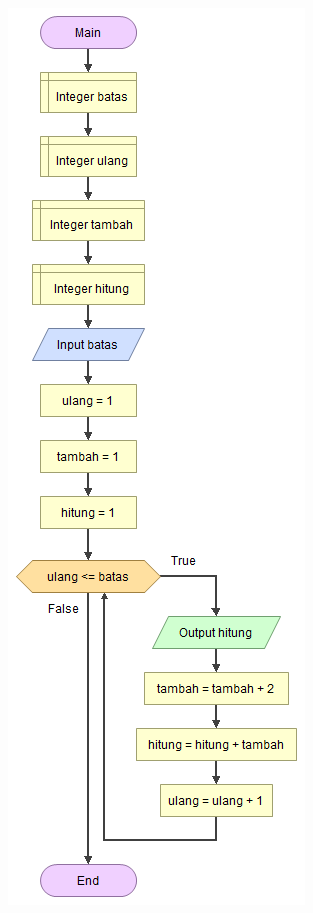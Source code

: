 \documentclass[a4paper,12pt]{article}
\begin{document}
\begin{center}
	\includegraphics[scale=.5]{main}
\end{center}
\end{document}

